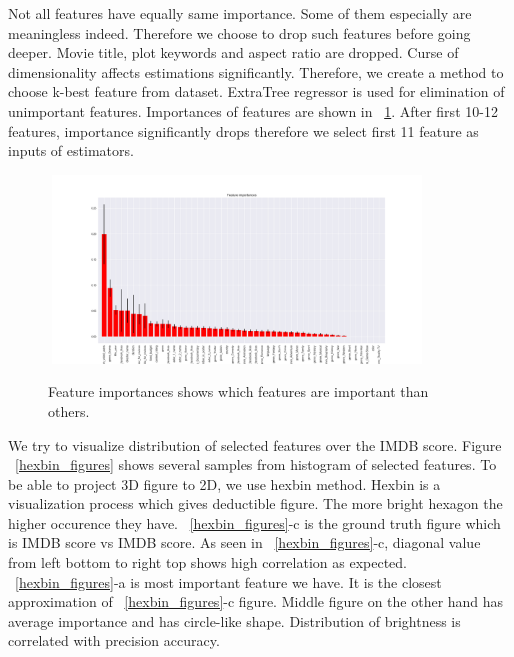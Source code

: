 \documentclass{article}
\begin{document}
	Not all features have equally same importance. Some of them especially are meaningless indeed. Therefore we choose to drop such features before going deeper. Movie title, plot keywords and aspect ratio are dropped. 
	Curse of dimensionality affects estimations significantly. Therefore, we create a method to choose k-best feature from dataset. ExtraTree regressor is used for elimination of unimportant features. Importances of features are shown in ~\ref{importances_figure}. After first 10-12 features, importance significantly drops therefore we select first 11 feature as inputs of estimators.
\begin{figure}[H]
    \caption{Feature importances shows which features are important than others.}
    \centering
     \includegraphics[width=10cm, height=5cm]{importances}
     \label{importances_figure}
\end{figure}
We try to visualize distribution of selected features over the IMDB score. Figure ~\ref{hexbin_figures} shows several samples from histogram of selected features. To be able to project 3D figure to 2D, we use hexbin method. Hexbin is a visualization process which gives deductible figure. The more bright hexagon the higher occurence they have. ~\ref{hexbin_figures}-c is the ground truth figure which is IMDB score vs IMDB score. As seen in ~\ref{hexbin_figures}-c, diagonal value from left bottom to right top shows high correlation as expected. ~\ref{hexbin_figures}-a is most important feature we have. It is the closest approximation of ~\ref{hexbin_figures}-c figure. Middle figure on the other hand has average importance and has circle-like shape. Distribution of brightness is correlated with precision accuracy.
\end{document}
